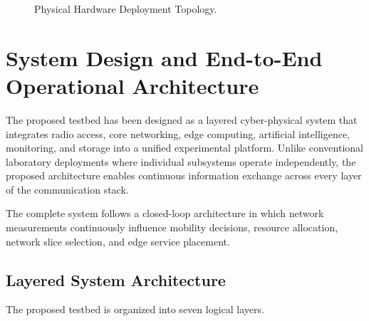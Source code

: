 \documentclass[12pt,a4paper]{article}\usepackage[a4paper,margin=1in]{geometry}\usepackage{graphicx}\usepackage{longtable}\usepackage{booktabs}\usepackage{hyperref}\usepackage{enumitem}\usepackage{amsmath}\usepackage{tikz}\usepackage{pgfgantt}\usepackage{setspace}\setstretch{1.15}\usetikzlibrary{positioning,arrows.meta,shapes.geometric}
\begin{document}
\begin{figure}[htbp]
		
		\caption{Physical Hardware Deployment Topology.}
		
		\label{fig:physical_architecture}
		
	\end{figure}
	
	\section{System Design and End-to-End Operational Architecture}
	
	The proposed testbed has been designed as a layered cyber-physical system that integrates radio access, core networking, edge computing, artificial intelligence, monitoring, and storage into a unified experimental platform. Unlike conventional laboratory deployments where individual subsystems operate independently, the proposed architecture enables continuous information exchange across every layer of the communication stack.
	
	The complete system follows a closed-loop architecture in which network measurements continuously influence mobility decisions, resource allocation, network slice selection, and edge service placement.
	
	
	\subsection{Layered System Architecture}
	
	The proposed testbed is organized into seven logical layers.
	
\end{document}

